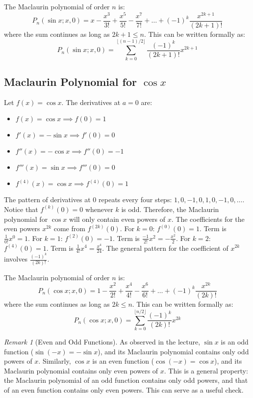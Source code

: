 \documentclass[11pt]{article}
\theoremstyle{definition}
\theoremstyle{remark}
\newtheorem{remark}[theorem]{Remark}
\begin{document}
The Maclaurin polynomial of order $n$ is:
\[ P_n(\sin x; x, 0) = x - \frac{x^3}{3!} + \frac{x^5}{5!} - \frac{x^7}{7!} + \dots + (-1)^k \frac{x^{2k+1}}{(2k+1)!} \]
where the sum continues as long as $2k+1 \le n$. This can be written formally as:
\[ P_n(\sin x; x, 0) = \sum_{k=0}^{\lfloor (n-1)/2 \rfloor} \frac{(-1)^k}{(2k+1)!}x^{2k+1} \]

\subsection{Maclaurin Polynomial for \texorpdfstring{$\cos x$}{cos(x)}}
Let $f(x) = \cos x$. The derivatives at $a=0$ are:
\begin{itemize}
    \item $f(x) = \cos x \implies f(0) = 1$
    \item $f'(x) = -\sin x \implies f'(0) = 0$
    \item $f''(x) = -\cos x \implies f''(0) = -1$
    \item $f'''(x) = \sin x \implies f'''(0) = 0$
    \item $f^{(4)}(x) = \cos x \implies f^{(4)}(0) = 1$
\end{itemize}
The pattern of derivatives at 0 repeats every four steps: $1, 0, -1, 0, 1, 0, -1, 0, \dots$.
Notice that $f^{(k)}(0) = 0$ whenever $k$ is odd. Therefore, the Maclaurin polynomial for $\cos x$ will only contain even powers of $x$.
The coefficients for the even powers $x^{2k}$ come from $f^{(2k)}(0)$.
For $k=0$: $f^{(0)}(0)=1$. Term is $\frac{1}{0!}x^0 = 1$.
For $k=1$: $f^{(2)}(0)=-1$. Term is $\frac{-1}{2!}x^2 = -\frac{x^2}{2}$.
For $k=2$: $f^{(4)}(0)=1$. Term is $\frac{1}{4!}x^4 = \frac{x^4}{24}$.
The general pattern for the coefficient of $x^{2k}$ involves $\frac{(-1)^k}{(2k)!}$.

The Maclaurin polynomial of order $n$ is:
\[ P_n(\cos x; x, 0) = 1 - \frac{x^2}{2!} + \frac{x^4}{4!} - \frac{x^6}{6!} + \dots + (-1)^k \frac{x^{2k}}{(2k)!} \]
where the sum continues as long as $2k \le n$. This can be written formally as:
\[ P_n(\cos x; x, 0) = \sum_{k=0}^{\lfloor n/2 \rfloor} \frac{(-1)^k}{(2k)!}x^{2k} \]

\begin{remark}[Even and Odd Functions]
As observed in the lecture, $\sin x$ is an odd function ($\sin(-x) = -\sin x$), and its Maclaurin polynomial contains only odd powers of $x$. Similarly, $\cos x$ is an even function ($\cos(-x) = \cos x$), and its Maclaurin polynomial contains only even powers of $x$. This is a general property: the Maclaurin polynomial of an odd function contains only odd powers, and that of an even function contains only even powers. This can serve as a useful check.
\end{remark}
\end{document}
